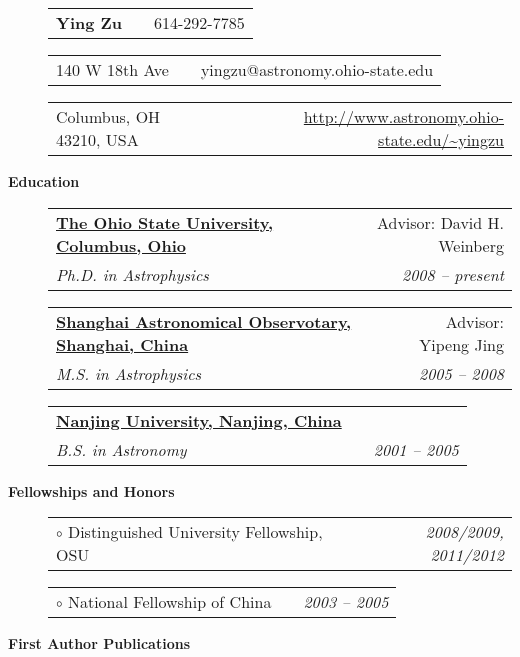 \documentclass[letterpaper,12pt]{article}
\makeatletter
\newcommand{\resheading}[1]{{\large
\colorbox{mygrey}{\begin{minipage}{6.5in}{\textbf{#1
    \vphantom{p\^{E}}}}\end{minipage}}}}
\newcommand{\toast}[2]{
 \begin{tabular*}{6.5in}{lr@{\extracolsep{\fill}}r} 
     #1          &             &           #2\\
 \end{tabular*}
 \vspace{-6pt}
}
\newcommand{\sandwich}[4]{
 \begin{tabular*}{6.5in}{lr@{\extracolsep{\fill}}r} 
     \textbf{#1} &             &           #2\\
     \textit{#3} &             & \textit{#4} \\ 
 \end{tabular*}
 \vspace{-6pt}
}
\makeatother
\begin{document}
\begin{description}
    \item[]\toast{\textbf{\large Ying Zu}}{614-292-7785}
    \item[]\toast{140 W 18th Ave}{yingzu@astronomy.ohio-state.edu}
    \item[]\toast{Columbus, OH 43210, USA}
        {\href{http://www.astronomy.ohio-state.edu/~yingzu}{\url{http://www.astronomy.ohio-state.edu/~yingzu}}}

\end{description}
\resheading{Education}
\begin{description}
    \item[]\sandwich{\href{http://www.astronomy.ohio-state.edu}{The Ohio State
    University, Columbus, Ohio}}{Advisor: David H. Weinberg }{\small Ph.D. in
    Astrophysics}{2008 -- present}
    \item[]\sandwich{\href{http://www.shao.ac.cn}{Shanghai Astronomical
    Observotary, Shanghai, China}}{Advisor: Yipeng Jing }{\small M.S. in
    Astrophysics}{2005 -- 2008}
    \item[]\sandwich{\href{http://www.nju.edu.cn}{Nanjing University, Nanjing,
    China}}{ }{\small B.S. in Astronomy}{2001 -- 2005}
\end{description}
\resheading{Fellowships and Honors}
\begin{description}
    \item[]\toast{$\circ$ Distinguished University Fellowship, OSU}{\textit{2008/2009, 2011/2012}}
    \item[]\toast{$\circ$ National Fellowship of China} {\textit{2003 -- 2005}}
\end{description}
\resheading{First Author Publications}
\end{document}
